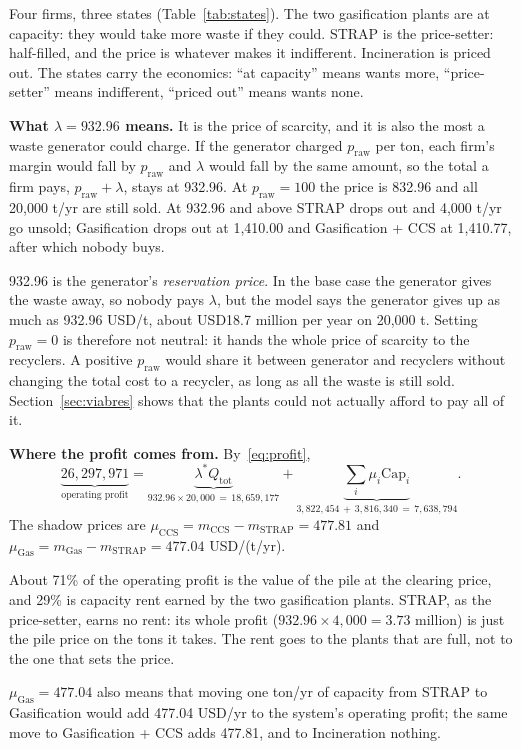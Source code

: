 \documentclass[11pt]{article}
\newcommand{\usd}{USD}
\newcommand{\gas}{\mathrm{Gas}}
\newcommand{\ccs}{\mathrm{CCS}}
\newcommand{\strap}{\mathrm{STRAP}}
\begin{document}
\begin{readbox}
Four firms, three states (Table~\ref{tab:states}). The two gasification plants are
at capacity: they would take more waste if they could. STRAP is the price-setter:
half-filled, and the price is whatever makes it indifferent. Incineration is priced
out. The states carry the economics: ``at capacity'' means wants more,
``price-setter'' means indifferent, ``priced out'' means wants none.
\end{readbox}

\textbf{What $\lambda=932.96$ means.} It is the price of scarcity, and it is also the
most a waste generator could charge. If the generator charged $p_{\mathrm{raw}}$ per
ton, each firm's margin would fall by $p_{\mathrm{raw}}$ and $\lambda$ would fall by
the same amount, so the total a firm pays, $p_{\mathrm{raw}}+\lambda$, stays at
932.96. At $p_{\mathrm{raw}}=100$ the price is 832.96 and all 20{,}000 t/yr are still
sold. At 932.96 and above STRAP drops out and 4{,}000 t/yr go unsold; Gasification
drops out at 1{,}410.00 and Gasification + CCS at 1{,}410.77, after which nobody buys.

\begin{readbox}
932.96 is the generator's \emph{reservation price}. In the base case the generator
gives the waste away, so nobody pays $\lambda$, but the model says the generator
gives up as much as 932.96 \usd/t, about \usd{}18.7 million per year on 20{,}000 t.
Setting $p_{\mathrm{raw}}=0$ is therefore not neutral: it hands the whole price of
scarcity to the recyclers. A positive $p_{\mathrm{raw}}$ would share it between
generator and recyclers without changing the total cost to a recycler, as long as
all the waste is still sold. Section~\ref{sec:viabres} shows that the plants could not
actually afford to pay all of it.
\end{readbox}

\textbf{Where the profit comes from.} By~\eqref{eq:profit},
\[
\underbrace{26{,}297{,}971}_{\text{operating profit}}
=\underbrace{\lambda^\ast Q_{\mathrm{tot}}}_{932.96\times20{,}000\,=\,18{,}659{,}177}
+\underbrace{\textstyle\sum_i\mu_i\mathrm{Cap}_i}_{3{,}822{,}454\,+\,3{,}816{,}340\,=\,7{,}638{,}794}.
\]
The shadow prices are $\mu_\ccs=m_\ccs-m_\strap=477.81$ and
$\mu_\gas=m_\gas-m_\strap=477.04$ \usd/(t/yr).

\begin{readbox}
About 71\% of the operating profit is the value of the pile at the clearing price,
and 29\% is capacity rent earned by the two gasification plants. STRAP, as the
price-setter, earns no rent: its whole profit ($932.96\times4{,}000=3.73$ million)
is just the pile price on the tons it takes. The rent goes to the plants that are
full, not to the one that sets the price.

$\mu_\gas=477.04$ also means that moving one ton/yr of capacity from STRAP to
Gasification would add 477.04 \usd/yr to the system's operating profit; the same move
to Gasification + CCS adds 477.81, and to Incineration nothing.
\end{readbox}
\end{document}
